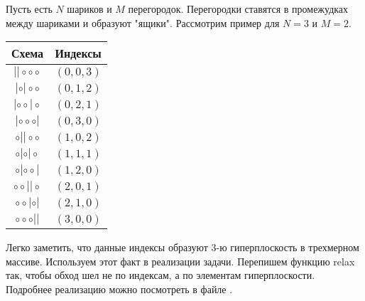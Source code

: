 Пусть есть $N$ шариков и $M$ перегородок. Перегородки ставятся в промежудках между шариками и образуют "ящики". Рассмотрим пример для $N=3$ и $M=2$.
\begin{center}
    \begin{tabular}{ c | c }
        Схема & Индексы\\
        \hline
        $ \mathtt{|| \circ  \circ  \circ} $ & $(0, 0, 3)$ \\
        $ | \circ | \circ  \circ $ & $(0, 1, 2)$ \\
        $ | \circ  \circ | \circ $ & $(0, 2, 1)$ \\
        $ | \circ  \circ  \circ | $ & $(0, 3, 0)$ \\
        $ \circ || \circ  \circ $ & $(1, 0, 2)$ \\
        $ \circ | \circ | \circ $ & $(1, 1, 1)$ \\
        $ \circ | \circ  \circ | $ & $(1, 2, 0)$ \\
        $ \circ  \circ || \circ $ & $(2, 0, 1)$ \\
        $ \circ  \circ | \circ | $ & $(2, 1, 0)$ \\
        $ \circ  \circ  \circ || $ & $(3, 0, 0)$ \\
    \end{tabular}
\end{center}

Легко заметить, что данные индексы образуют 3-ю гиперплоскость в трехмерном массиве. Используем этот факт в реализации задачи. Перепишем функцию relax так, чтобы обход шел не по индексам, а по элементам гиперплоскости. Подробнее реализацию можно посмотреть в файле .




